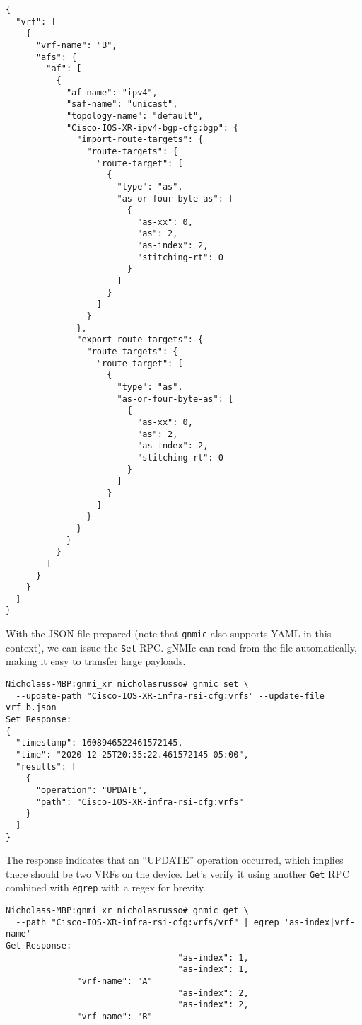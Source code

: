 \begin{verbatim}
{
  "vrf": [
    {
      "vrf-name": "B",
      "afs": {
        "af": [
          {
            "af-name": "ipv4",
            "saf-name": "unicast",
            "topology-name": "default",
            "Cisco-IOS-XR-ipv4-bgp-cfg:bgp": {
              "import-route-targets": {
                "route-targets": {
                  "route-target": [
                    {
                      "type": "as",
                      "as-or-four-byte-as": [
                        {
                          "as-xx": 0,
                          "as": 2,
                          "as-index": 2,
                          "stitching-rt": 0
                        }
                      ]
                    }
                  ]
                }
              },
              "export-route-targets": {
                "route-targets": {
                  "route-target": [
                    {
                      "type": "as",
                      "as-or-four-byte-as": [
                        {
                          "as-xx": 0,
                          "as": 2,
                          "as-index": 2,
                          "stitching-rt": 0
                        }
                      ]
                    }
                  ]
                }
              }
            }
          }
        ]
      }
    }
  ]
}
\end{verbatim}

With the JSON file prepared (note that \verb|gnmic| also supports YAML
in this context), we can issue the \verb|Set| RPC\@. gNMIc can read
from the file automatically, making it easy to transfer large payloads.

\begin{verbatim}
Nicholass-MBP:gnmi_xr nicholasrusso# gnmic set \
  --update-path "Cisco-IOS-XR-infra-rsi-cfg:vrfs" --update-file vrf_b.json
Set Response:
{
  "timestamp": 1608946522461572145,
  "time": "2020-12-25T20:35:22.461572145-05:00",
  "results": [
    {
      "operation": "UPDATE",
      "path": "Cisco-IOS-XR-infra-rsi-cfg:vrfs"
    }
  ]
}
\end{verbatim}

The response indicates that an ``UPDATE'' operation occurred, which implies
there should be two VRFs on the device. Let's verify it using another
\verb|Get| RPC combined with \verb|egrep| with a regex for brevity.

\begin{verbatim}
Nicholass-MBP:gnmi_xr nicholasrusso# gnmic get \
  --path "Cisco-IOS-XR-infra-rsi-cfg:vrfs/vrf" | egrep 'as-index|vrf-name'
Get Response:
                                  "as-index": 1,
                                  "as-index": 1,
              "vrf-name": "A"
                                  "as-index": 2,
                                  "as-index": 2,
              "vrf-name": "B"
\end{verbatim}

